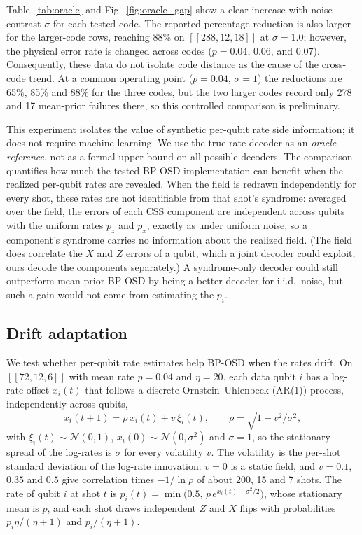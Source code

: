 \documentclass[a4paper,twocolumn,11pt,nopdfoutputerror]{quantumarticle}
\newcommand{\code}[3]{\ensuremath{[\![#1,#2,#3]\!]}}
\begin{document}
Table~\ref{tab:oracle} and Fig.~\ref{fig:oracle_gap} show a clear
increase with noise contrast $\sigma$ for each tested code. The reported
percentage reduction is also larger for the larger-code rows, reaching
$88\%$ on $\code{288}{12}{18}$ at $\sigma=1.0$; however, the physical
error rate is changed across codes ($p=0.04$, $0.06$, and $0.07$).
Consequently, these data do not isolate code distance as the cause of
the cross-code trend. At a common operating point ($p=0.04$, $\sigma=1$)
the reductions are 65\%, 85\% and 88\% for the three codes, but the
two larger codes record only 278 and 17 mean-prior failures there, so
this controlled comparison is preliminary.

This experiment isolates the value of synthetic per-qubit rate side
information; it does not require machine learning. We use the true-rate
decoder as an \emph{oracle reference}, not as a formal upper bound on all
possible decoders. The comparison quantifies how much the tested BP-OSD
implementation can benefit when the realized per-qubit rates are
revealed. When the field is redrawn independently for every shot, these
rates are not identifiable from that shot's syndrome: averaged over the
field, the errors of each CSS component are independent across qubits
with the uniform rates $p_z$ and $p_x$, exactly as under uniform noise, so
a component's syndrome carries no information about the realized field.
(The field does correlate the $X$ and $Z$ errors of a qubit, which a joint
decoder could exploit; ours decode the components separately.) A
syndrome-only decoder could still outperform mean-prior BP-OSD by being a
better decoder for i.i.d.\ noise, but such a gain would not come from
estimating the $p_i$.

\subsection{Drift adaptation}\label{sec:drift}

We test whether per-qubit rate estimates help BP-OSD when the rates
drift. On $\code{72}{12}{6}$ with mean rate $p=0.04$ and $\eta=20$, each
data qubit $i$ has a log-rate offset $x_i(t)$ that follows a discrete
Ornstein--Uhlenbeck (AR(1)) process, independently across qubits,
\begin{equation}
x_i(t+1)=\rho\,x_i(t)+v\,\xi_i(t),\qquad \rho=\sqrt{1-v^2/\sigma^2},
\label{eq:ou}
\end{equation}
with $\xi_i(t)\sim\mathcal N(0,1)$, $x_i(0)\sim\mathcal N(0,\sigma^2)$ and
$\sigma=1$, so the stationary spread of the log-rates is $\sigma$ for every
volatility $v$. The volatility is the per-shot standard deviation of the
log-rate innovation: $v=0$ is a static field, and $v=0.1$, $0.35$ and $0.5$
give correlation times $-1/\ln\rho$ of about 200, 15 and 7 shots. The rate
of qubit $i$ at shot $t$ is $p_i(t)=\min\bigl(0.5,\,p\,e^{x_i(t)-\sigma^2/2}\bigr)$,
whose stationary mean is $p$, and each shot draws independent $Z$ and $X$
flips with probabilities $p_i\eta/(\eta+1)$ and $p_i/(\eta+1)$.
\end{document}
